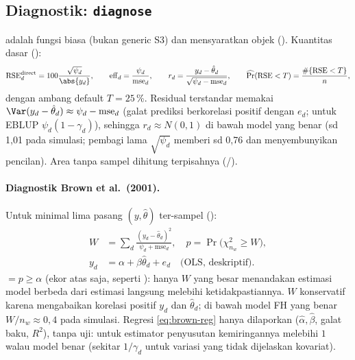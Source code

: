 \subsection{Diagnostik: \texttt{diagnose}}\label{sec:diagnose}

 adalah fungsi biasa (bukan generic S3) dan mensyaratkan
objek  (). Kuantitas dasar
():
\begin{equation}
  \mathrm{RSE}^{\text{direct}}_d=100\frac{\sqrt{\psi_d}}{\abs{y_d}},
  \qquad
  \mathrm{eff}_d=\frac{\psi_d}{\mathrm{mse}_d},
  \qquad
  r_d=\frac{y_d-\hat\theta_d}{\sqrt{\psi_d-\mathrm{mse}_d}},
  \qquad
  \widehat{\Pr}(\mathrm{RSE}<T)=\frac{\#\{\mathrm{RSE}<T\}}{n},
  \label{eq:diag-basic}
\end{equation}
dengan ambang default $T=25$\,\%. Residual terstandar memakai
$\Var(y_d-\hat\theta_d)\approx\psi_d-\mathrm{mse}_d$ (galat prediksi berkorelasi positif
dengan $e_d$; untuk EBLUP $\psi_d(1-\gamma_d)$), sehingga $r_d\approx N(0,1)$ di bawah model
yang benar (sd 1,01 pada simulasi; pembagi lama $\sqrt{\psi_d}$ memberi sd 0,76 dan
menyembunyikan pencilan). Area tanpa sampel dihitung
terpisahnya (/).

\paragraph{Diagnostik Brown et al.\ (2001).} Untuk minimal lima pasang
$(y,\hat\theta)$ ter-sampel ():
\begin{align}
  W&=\sum_d\frac{(y_d-\hat\theta_d)^2}{\psi_d+\mathrm{mse}_d},
    \quad p=\Pr\bigl(\chi^2_{n_w}\ge W\bigr), \label{eq:brown-gof}\\
  y_d&=\alpha+\beta\hat\theta_d+e_d \quad\text{(OLS, deskriptif)}. \label{eq:brown-reg}
\end{align}
 $=p\ge\alpha$ (ekor atas saja, seperti
): hanya $W$ yang besar menandakan estimasi model
berbeda dari estimasi langsung melebihi ketidakpastiannya. $W$ konservatif
karena mengabaikan korelasi positif $y_d$ dan $\hat\theta_d$; di bawah model
FH yang benar $W/n_w\approx0{,}4$ pada simulasi. Regresi \eqref{eq:brown-reg}
hanya dilaporkan ($\hat\alpha,\hat\beta$, galat baku, $R^2$), tanpa uji:
untuk estimator penyusutan kemiringannya melebihi $1$ walau model benar
(sekitar $1/\gamma_d$ untuk variasi yang tidak dijelaskan kovariat).


